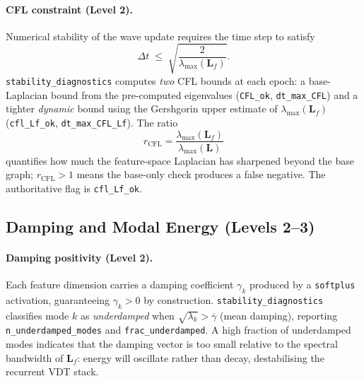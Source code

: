 \documentclass[11pt,a4paper]{article}
\newcommand{\Lmat}{\mathbf{L}}
\begin{document}
\paragraph{CFL constraint (Level 2).}
Numerical stability of the wave update requires the time step to satisfy
\begin{equation}
  \Delta t \;\leq\; \sqrt{\frac{2}{\lambda_{\max}(\Lmat_f)}}.
  \label{eq:cfl}
\end{equation}
\texttt{stability\_diagnostics} computes \emph{two} CFL bounds at each epoch:
a base-Laplacian bound from the pre-computed eigenvalues (\texttt{CFL\_ok},
\texttt{dt\_max\_CFL}) and a tighter \emph{dynamic} bound using the
Gershgorin upper estimate of $\lambda_{\max}(\Lmat_f)$
(\texttt{cfl\_Lf\_ok}, \texttt{dt\_max\_CFL\_Lf}).
The ratio
\begin{equation}
  r_{\mathrm{CFL}} = \frac{\lambda_{\max}(\Lmat_f)}{\lambda_{\max}(\Lmat)}
  \label{eq:cfl-margin}
\end{equation}
quantifies how much the feature-space Laplacian has sharpened beyond the base
graph; $r_{\mathrm{CFL}} > 1$ means the base-only check produces a false
negative.  The authoritative flag is \texttt{cfl\_Lf\_ok}.


\subsection{Damping and Modal Energy (Levels 2--3)}
\label{sec:stability:damping}

\paragraph{Damping positivity (Level 2).}
Each feature dimension carries a damping coefficient $\gamma_k$ produced by a
\texttt{softplus} activation, guaranteeing $\gamma_k > 0$ by construction.
\texttt{stability\_diagnostics} classifies mode $k$ as \emph{underdamped} when
$\sqrt{\lambda_k} > \overline{\gamma}$ (mean damping), reporting
\texttt{n\_underdamped\_modes} and \texttt{frac\_underdamped}.
A high fraction of underdamped modes indicates that the damping vector is too
small relative to the spectral bandwidth of $\Lmat_f$: energy will oscillate
rather than decay, destabilising the recurrent VDT stack.
\end{document}
